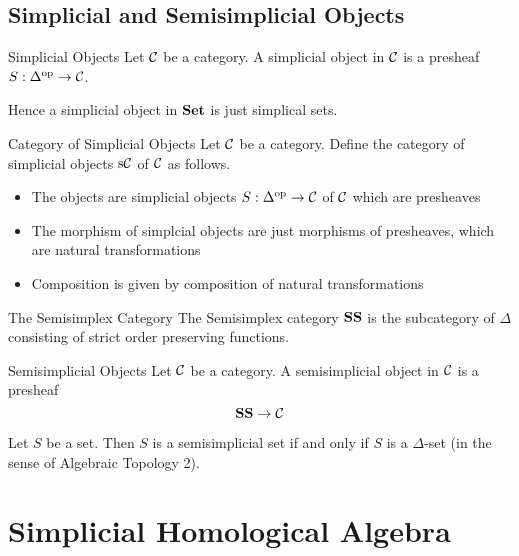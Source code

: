 \documentclass[a4paper]{article}
\begin{document}
\subsection{Simplicial and Semisimplicial Objects}
\begin{defn}{Simplicial Objects}{} Let $\mathcal{C}$ be a category. A simplicial object in $\mathcal{C}$ is a presheaf $S:\Delta^\text{op}\to\mathcal{C}$. 
\end{defn}

Hence a simplicial object in $\bold{Set}$ is just simplical sets. 

\begin{defn}{Category of Simplicial Objects}{} Let $\mathcal{C}$ be a category. Define the category of simplicial objects $\text{s}\mathcal{C}$ of $\mathcal{C}$ as follows. 
\begin{itemize}
\item The objects are simplicial objects $S:\Delta^\text{op}\to\mathcal{C}$ of $\mathcal{C}$ which are presheaves
\item The morphism of simplcial objects are just morphisms of presheaves, which are natural transformations
\item Composition is given by composition of natural transformations
\end{itemize}
\end{defn}

\begin{defn}{The Semisimplex Category}{} The Semisimplex category $\bold{SS}$ is the subcategory of $\Delta$ consisting of strict order preserving functions. 
\end{defn}

\begin{defn}{Semisimplicial Objects}{} Let $\mathcal{C}$ be a category. A semisimplicial object in $\mathcal{C}$ is a presheaf $$\bold{SS}\to\mathcal{C}$$
\end{defn}

\begin{lmm}{}{} Let $S$ be a set. Then $S$ is a semisimplicial set if and only if $S$ is a $\Delta$-set (in the sense of Algebraic Topology 2). 
\end{lmm}

\pagebreak
\section{Simplicial Homological Algebra}
\end{document}
